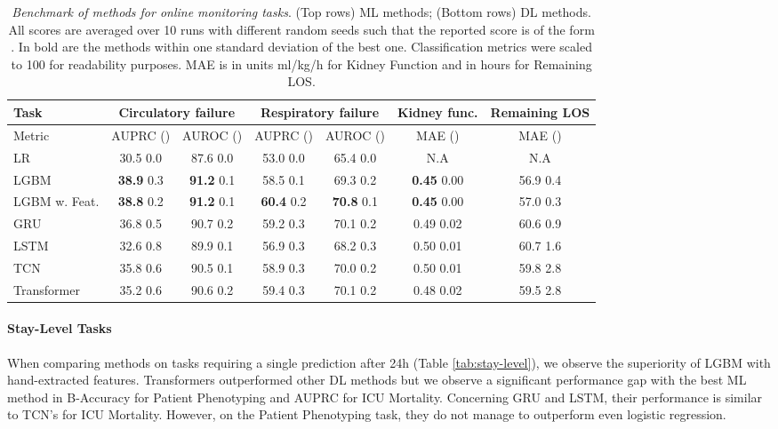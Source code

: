 \documentclass{article}
\begin{document}
\begin{table}[!ht]
    \centering
    \footnotesize
\setlength\tabcolsep{4pt}
\caption{\textit{Benchmark of methods for online monitoring tasks}. (Top rows) ML methods; (Bottom rows) DL methods. All scores are averaged over 10 runs with different random seeds such that the reported score is of the form . In bold are the methods within one standard deviation of the best one. Classification metrics were scaled to 100 for readability purposes. MAE is in units ml/kg/h for Kidney Function and in hours for Remaining LOS.}
\begin{tabular}{l|cc|cc||c|c}
\toprule
Task  & \multicolumn{2}{c|}{Circulatory failure} & \multicolumn{2}{c||}{Respiratory failure} &    Kidney func. &       Remaining LOS \\
\midrule
Metric  &      AUPRC () & AUROC () &  AUPRC () & AUROC () & MAE () &  MAE () \\
\midrule
LR                 &          30.5  0.0 &     87.6  0.0 &       53.0  0.0 &      65.4  0.0 &     N.A &       N.A \\
LGBM               &          \textbf{38.9}  0.3 &     \textbf{91.2}  0.1 &      58.5  0.1 &     69.3  0.2 &     \textbf{0.45}  0.00 &   56.9  0.4 \\
LGBM w. Feat.      &          \textbf{38.8}  0.2 &     \textbf{91.2}  0.1 &      \textbf{60.4}  0.2 &    \textbf{ 70.8}  0.1 &     \textbf{0.45}  0.00 &   57.0  0.3 \\
\midrule
\midrule
GRU                &         36.8  0.5 &     90.7  0.2 &      59.2  0.3 &     70.1  0.2 &     0.49  0.02 &   60.6  0.9 \\
LSTM               &         32.6  0.8 &     89.9  0.1 &      56.9  0.3 &     68.2  0.3 &     0.50  0.01 &  60.7  1.6 \\
TCN                &         35.8  0.6 &     90.5  0.1 &      58.9  0.3 &     70.0  0.2 &      0.50  0.01 &  59.8  2.8 \\
Transformer        &         35.2  0.6 &     90.6  0.2 &      59.4  0.3 &     70.1  0.2 &      0.48  0.02 &       59.5  2.8 \\
\bottomrule
\end{tabular}
    \label{tab:online-level}
\end{table}

\paragraph{Stay-Level Tasks} When comparing methods on tasks requiring a single prediction after 24h (Table \ref{tab:stay-level}), we observe the superiority of LGBM with hand-extracted features. Transformers outperformed other DL methods but we observe a significant performance gap with the best ML method in B-Accuracy for Patient Phenotyping and AUPRC for ICU Mortality. Concerning GRU and LSTM, their performance is similar to TCN's for ICU Mortality. However, on the Patient Phenotyping task, they do not manage to outperform even logistic regression.
\end{document}
